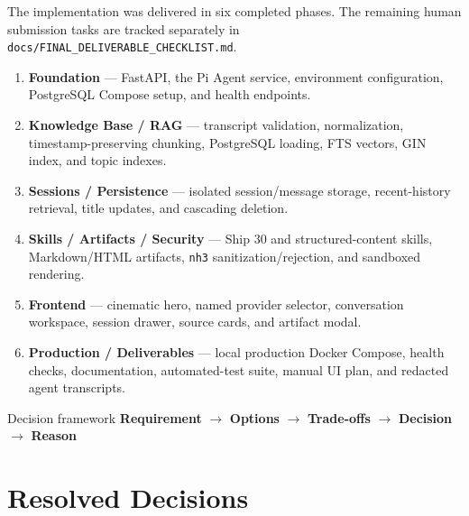 \documentclass[11pt]{article}
\newcommand{\flowarrow}{\textcolor{Brand}{\ensuremath{\rightarrow}}}
\begin{document}
The implementation was delivered in six completed phases. The remaining human submission tasks are tracked separately in \texttt{docs/FINAL\_DELIVERABLE\_CHECKLIST.md}.
\begin{enumerate}
  \item \textbf{Foundation} --- FastAPI, the Pi Agent service, environment configuration, PostgreSQL Compose setup, and health endpoints.
  \item \textbf{Knowledge Base / RAG} --- transcript validation, normalization, timestamp-preserving chunking, PostgreSQL loading, FTS vectors, GIN index, and topic indexes.
  \item \textbf{Sessions / Persistence} --- isolated session/message storage, recent-history retrieval, title updates, and cascading deletion.
  \item \textbf{Skills / Artifacts / Security} --- Ship 30 and structured-content skills, Markdown/HTML artifacts, \texttt{nh3} sanitization/rejection, and sandboxed rendering.
  \item \textbf{Frontend} --- cinematic hero, named provider selector, conversation workspace, session drawer, source cards, and artifact modal.
  \item \textbf{Production / Deliverables} --- local production Docker Compose, health checks, documentation, automated-test suite, manual UI plan, and redacted agent transcripts.
\end{enumerate}

\begin{principlebox}{Decision framework}
\centering
\textbf{Requirement} \flowarrow{} \textbf{Options} \flowarrow{} \textbf{Trade-offs} \flowarrow{} \textbf{Decision} \flowarrow{} \textbf{Reason}
\end{principlebox}

\section{Resolved Decisions}
\end{document}

